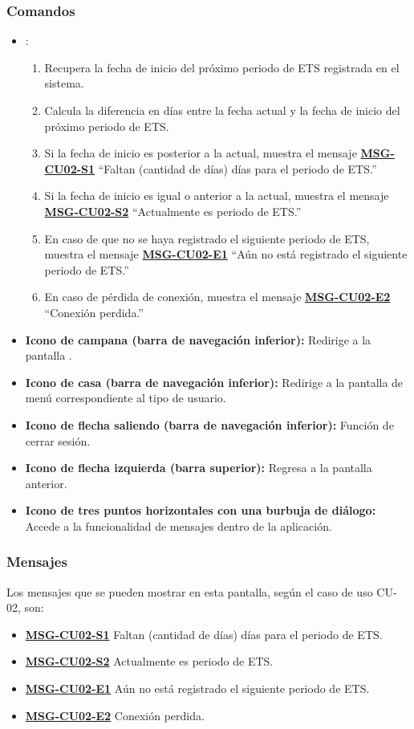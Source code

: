 \subsubsection{Comandos}
\begin{itemize}
	\item {}:
	\begin{enumerate}
		\item Recupera la fecha de inicio del próximo periodo de ETS registrada en el sistema.
		\item Calcula la diferencia en días entre la fecha actual y la fecha de inicio del próximo periodo de ETS.
		\item Si la fecha de inicio es posterior a la actual, muestra el mensaje \textbf{\hyperref[msg:CU02-S1]{MSG-CU02-S1}} ``Faltan (cantidad de días) días para el periodo de ETS.''
		\item Si la fecha de inicio es igual o anterior a la actual, muestra el mensaje \textbf{\hyperref[msg:CU02-S2]{MSG-CU02-S2}} ``Actualmente es periodo de ETS.''
		\item En caso de que no se haya registrado el siguiente periodo de ETS, muestra el mensaje \textbf{\hyperref[msg:CU02-E1]{MSG-CU02-E1}} ``Aún no está registrado el siguiente periodo de ETS.''
		\item En caso de pérdida de conexión, muestra el mensaje \textbf{\hyperref[msg:CU02-E2]{MSG-CU02-E2}} ``Conexión perdida.''
	\end{enumerate}
	\item \textbf{Icono de campana (barra de navegación inferior):} Redirige a la pantalla .
	\item \textbf{Icono de casa (barra de navegación inferior):} Redirige a la pantalla de menú correspondiente al tipo de usuario.
	\item \textbf{Icono de flecha saliendo (barra de navegación inferior):} Función de cerrar sesión.
	\item \textbf{Icono de flecha izquierda (barra superior):} Regresa a la pantalla anterior.
	\item \textbf{Icono de tres puntos horizontales con una burbuja de diálogo:} Accede a la funcionalidad de mensajes dentro de la aplicación.
\end{itemize}

\subsubsection{Mensajes}
Los mensajes que se pueden mostrar en esta pantalla, según el caso de uso CU-02, son:
\begin{itemize}
	\item \textbf{\hyperref[msg:CU02-S1]{MSG-CU02-S1}} Faltan (cantidad de días) días para el periodo de ETS.
	\item \textbf{\hyperref[msg:CU02-S2]{MSG-CU02-S2}} Actualmente es periodo de ETS.
	\item \textbf{\hyperref[msg:CU02-E1]{MSG-CU02-E1}} Aún no está registrado el siguiente periodo de ETS.
	\item \textbf{\hyperref[msg:CU02-E2]{MSG-CU02-E2}} Conexión perdida.
\end{itemize}

